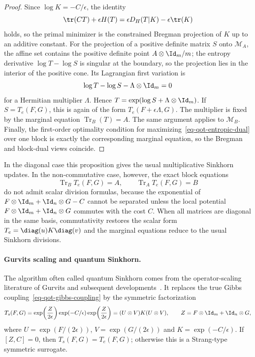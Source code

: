 \begin{proof}
	Since $\log K=-C/\epsilon$, the identity
	\[
		\tr(CT)+\epsilon H(T)
		=
		\epsilon D_H(T|K)-\epsilon\tr(K)
	\]
	holds, so the primal minimizer is the constrained Bregman projection of $K$ up to an additive constant. For the projection of a positive definite matrix $S$ onto $\mathcal M_A$, the affine set contains the positive definite point $A\otimes\Id_m/m$; the entropy derivative $\log T-\log S$ is singular at the boundary, so the projection lies in the interior of the positive cone. Its Lagrangian first variation is
	\[
		\log T-\log S-\Lambda\otimes\Id_m=0
	\]
	for a Hermitian multiplier $\Lambda$. Hence $T=\exp(\log S+\Lambda\otimes\Id_m)$. If $S=T_e(F,G)$, this is again of the form $T_e(F+\epsilon\Lambda,G)$. The multiplier is fixed by the marginal equation $\operatorname{Tr}_B(T)=A$. The same argument applies to $\mathcal M_B$. Finally, the first-order optimality condition for maximizing~\eqref{eq-qot-entropic-dual} over one block is exactly the corresponding marginal equation, so the Bregman and block-dual views coincide.
\end{proof}

In the diagonal case this proposition gives the usual multiplicative Sinkhorn updates. In the non-commutative case, however, the exact block equations
\[
	\operatorname{Tr}_B T_e(F,G)=A,
	\qquad
	\operatorname{Tr}_A T_e(F,G)=B
\]
do not admit scalar division formulas, because the exponential of $F\otimes\Id_m+\Id_n\otimes G-C$ cannot be separated unless the local potential $F\otimes\Id_m+\Id_n\otimes G$ commutes with the cost $C$.
When all matrices are diagonal in the same basis, commutativity restores the scalar form $T_e=\diag(u)K\diag(v)$ and the marginal equations reduce to the usual Sinkhorn divisions.

\paragraph{Gurvits scaling and quantum Sinkhorn.}
The algorithm often called quantum Sinkhorn comes from the operator-scaling literature of Gurvits and subsequent developments~\cite{gurvits2003classical,gurvits2004classical,georgiou2015positive,garg2018recent}. It replaces the true Gibbs coupling~\eqref{eq-qot-gibbs-coupling} by the symmetric factorization
\begin{equation}\label{eq-qot-symmetric-scaling}
	T_s(F,G)
	=
	\exp\!\left(\frac{Z}{2\epsilon}\right)\exp(-C/\epsilon)\exp\!\left(\frac{Z}{2\epsilon}\right)
	=
	(U\otimes V)K(U\otimes V),
	\qquad
	Z=F\otimes\Id_m+\Id_n\otimes G,
\end{equation}
where $U=\exp(F/(2\epsilon))$, $V=\exp(G/(2\epsilon))$ and $K=\exp(-C/\epsilon)$. If $[Z,C]=0$, then $T_s(F,G)=T_e(F,G)$; otherwise this is a Strang-type symmetric surrogate.

